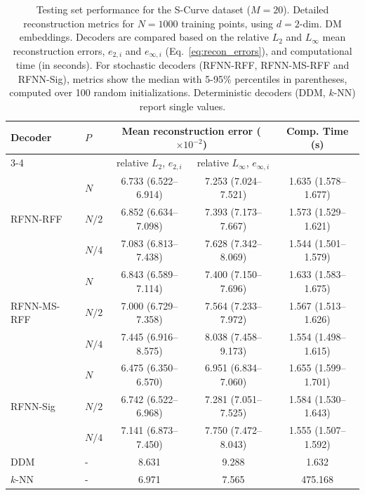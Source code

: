 \documentclass{article}
\begin{document}
\begin{table}[htbp]
\centering
\caption{Testing set performance for the S-Curve dataset ($M=20$). Detailed reconstruction metrics for $N=1000$ training points, using $d=2$-dim. DM embeddings. Decoders are compared based on the relative $L_2$ and $L_\infty$ mean reconstruction errors, $e_{2,i}$ and $e_{\infty,i}$ (Eq.~\eqref{eq:recon_errors}), and computational time (in seconds). For stochastic decoders (RFNN-RFF, RFNN-MS-RFF and RFNN-Sig), metrics show the median with 5-95\% percentiles in parentheses, computed over 100 random initializations. Deterministic decoders (DDM, $k$-NN) report single values.}
\label{tab:SC20_dec_ts_all}
\begin{tabular}{@{}llccc@{}}
\multirow{2}{*}{Decoder} & \multirow{2}{*}{$P$} & \multicolumn{2}{c}{Mean reconstruction error ($\times 10^{-2}$)} & \multirow{2}{*}{Comp. Time (s)} \\
\cmidrule(lr){3-4}
& & relative $L_2$, $e_{2,i}$ &  relative $L_\infty$, $e_{\infty,i}$ &  \\
\midrule
\midrule

\multirow{3}{*}{RFNN-RFF} 
&	$N$	    & 6.733 (6.522--6.914) & 7.253 (7.024--7.521) & 1.635 (1.578--1.677) \\
&	$N/2$	& 6.852 (6.634--7.098) & 7.393 (7.173--7.667) & 1.573 (1.529--1.621) \\
&	$N/4$	& 7.083 (6.813--7.438) & 7.628 (7.342--8.069) & 1.544 (1.501--1.579) \\
\midrule

\multirow{3}{*}{RFNN-MS-RFF} 
&	$N$	    & 6.843 (6.589--7.114) & 7.400 (7.150--7.696) & 1.633 (1.583--1.675) \\
&	$N/2$	& 7.000 (6.729--7.358) & 7.564 (7.233--7.972) & 1.567 (1.513--1.626) \\
&	$N/4$	& 7.445 (6.916--8.575) & 8.038 (7.458--9.173) & 1.554 (1.498--1.615) \\
\midrule

\multirow{3}{*}{RFNN-Sig} 
&	$N$	    & 6.475 (6.350--6.570) & 6.951 (6.834--7.060) & 1.655 (1.599--1.701) \\
&	$N/2$	& 6.742 (6.522--6.968) & 7.281 (7.051--7.525) & 1.584 (1.530--1.643) \\
&	$N/4$	& 7.141 (6.873--7.450) & 7.750 (7.472--8.043) & 1.555 (1.507--1.592) \\
\midrule

DDM  &	-	& 8.631 & 9.288 & 1.632 \\
$k$-NN &	-	& 6.971 & 7.565 & 475.168 \\
\bottomrule
\end{tabular}%
\end{table}
\end{document}
